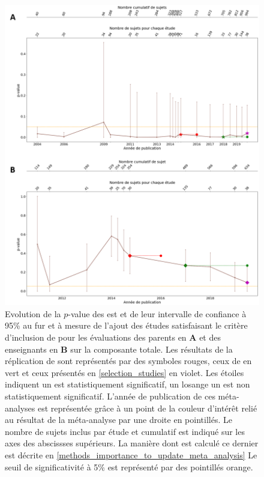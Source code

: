 \begin{figure}[t]
  \centering
	\includegraphics[width=1\linewidth]{figures/chapter-2/meta-analysis-evolution-pvalue-total} 
  \caption[Evolution de la $p$-value des \gls{est} au fur et à mesure de l'ajout de nouvelles études.]{Evolution de la $p$-value des \gls{est} et de leur intervalle de confiance à 95\% au fur et à mesure de l'ajout des études satisfaisant le critère d'inclusion de \citet{Cortese2016} pour les évaluations des 
	parents en \textbf{A} et des enseignants en \textbf{B} sur la composante totale.
  Les résultats de la réplication de \citet{Cortese2016} sont représentés par des symboles rouges, ceux de \citet{Bussalb2019clinical} en vert et ceux présentés en \ref{selection_studies} en violet. Les étoiles 
	indiquent un \gls{est} statistiquement significatif, un losange un \gls{est} non statistiquement significatif. L'année de publication de ces méta-analyses est représentée grâce à un point de la couleur 
	d'intérêt relié au résultat de la méta-analyse par une droite en pointillés.
	Le nombre de sujets inclus par étude et cumulatif est indiqué sur les axes des abscissses supérieurs. La manière dont est calculé ce dernier est 
	décrite en \ref{methods_importance_to_update_meta_analysis}
	Le seuil de significativité à 5\% est représenté par des pointillés orange.}
  \label{Figure:meta_analysis_evolution_pvalue_total}
\end{figure}

